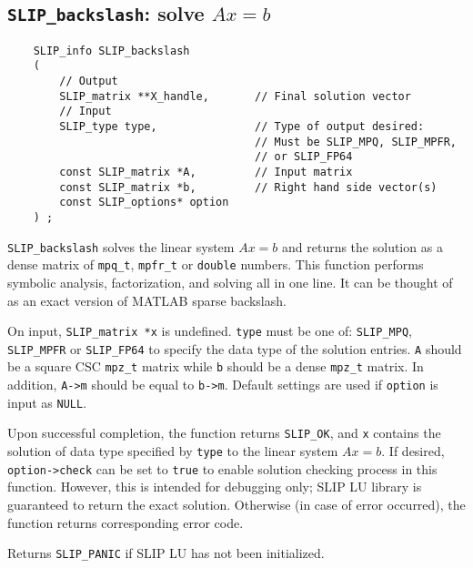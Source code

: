 \documentclass[12pt]{article}
\theoremstyle{definition}
\begin{document}
\newpage
\cprotect\subsection{\verb|SLIP_backslash|: solve $Ax=b$}
\label{ss:SLIP_backslash}

\begin{mdframed}[userdefinedwidth=6in]
{\footnotesize
\begin{verbatim}
    SLIP_info SLIP_backslash
    (
        // Output
        SLIP_matrix **X_handle,       // Final solution vector
        // Input
        SLIP_type type,               // Type of output desired:
                                      // Must be SLIP_MPQ, SLIP_MPFR,
                                      // or SLIP_FP64
        const SLIP_matrix *A,         // Input matrix
        const SLIP_matrix *b,         // Right hand side vector(s)
        const SLIP_options* option
    ) ;
\end{verbatim}
} \end{mdframed}

\verb|SLIP_backslash| solves the linear system $Ax=b$ and returns the solution
as a dense matrix of \verb|mpq_t|, \verb|mpfr_t| or \verb|double| numbers. This
function performs symbolic analysis, factorization, and solving all in one line. 
It can be thought of as an exact version of MATLAB sparse backslash.

On input, \verb|SLIP_matrix *x| is undefined. \verb|type| must be one of:
\verb|SLIP_MPQ|, \verb|SLIP_MPFR| or \verb|SLIP_FP64| to specify the data type
of the solution entries. \verb|A| should be a square CSC \verb|mpz_t| matrix
while \verb|b| should be a dense \verb|mpz_t| matrix. In addition, \verb|A->m|
should be equal to \verb|b->m|.  Default settings are used if
\verb|option| is input as \verb|NULL|.

Upon successful completion, the function returns \verb|SLIP_OK|, and
\verb|x| contains the solution of data type specified by
\verb|type| to the linear system $Ax=b$. If desired, \verb|option->check| can
be set to \verb|true| to enable solution checking process in this function.
However, this is intended for debugging only; SLIP LU library is guaranteed to
return the exact solution. Otherwise (in case of error occurred), the function
returns corresponding error code.

Returns \verb|SLIP_PANIC| if SLIP LU has not been initialized.
\end{document}
